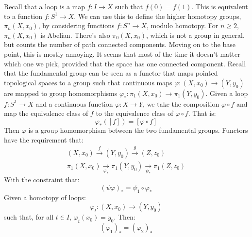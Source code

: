         Recall that a loop is a map $f:I\rightarrow{X}$
        such that $f(0)=f(1)$. This is equivalent to a
        function $f:S^{1}\rightarrow{X}$. We can use this to
        define the higher homotopy groups, $\pi_{n}(X,x_{0})$,
        by considering functions $f:S^{n}\rightarrow{X}$,
        modulo homotopy. For $n\geq{2}$,
        $\pi_{n}(X,x_{0})$ is Abelian. There's also
        $\pi_{0}(X,x_{0})$, which is not a group in general,
        but counts the number of path connected components.
        Moving on to the base point, this is mostly annoying.
        It seems that most of the time it doesn't matter which
        one we pick, provided that the space has one connected
        component. Recall that the fundamental group can be
        seen as a functor that maps pointed topological
        spaces to a group such that continuous maps
        $\varphi:(X,x_{0})\rightarrow(Y,y_{0})$ are mapped
        to group homomorphisms
        $\varphi_{*}:\pi_{1}(X,x_{0})\rightarrow\pi_{1}(Y,y_{0})$.
        Given a loop $f:S^{1}\rightarrow{X}$ and a continuous
        function $\varphi:X\rightarrow{Y}$, we take the
        composition $\varphi\circ{f}$ and map the equivalence
        class of $f$ to the equivalence class of
        $\varphi\circ{f}$. That is:
        \begin{equation}
            \varphi_{*}([f])=[\varphi\circ{f}]
        \end{equation}
        Then $\varphi$ is a group homomorphism between the
        two fundamental groups. Functors have the requirement
        that:
        \begin{align}
            (X,x_{0})\overset{f}{\longrightarrow}
            (Y,y_{0})\overset{g}{\longrightarrow}
            (Z,z_{0})\\
            \pi_{1}(X,x_{0})
                \underset{\varphi_{*}}{\longrightarrow}
            \pi_{1}(Y,y_{0})
                \underset{\psi_{*}}{\longrightarrow}
            \pi_{1}(Z,z_{0})
        \end{align}
        With the constraint that:
        \begin{equation}
            (\psi\varphi)_{*}=\psi_{1}\circ\varphi_{*}
        \end{equation}
        Given a homotopy of loops:
        \begin{equation}
            \varphi_{t}:(X,x_{0})\rightarrow(Y,y_{0})
        \end{equation}
        such that, for all $t\in{I}$, $\varphi_{t}(x_{0})=y_{0}$.
        Then:
        \begin{equation}
            (\varphi_{1})_{*}=(\varphi_{2})_{*}
        \end{equation}
